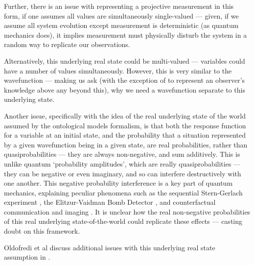 \documentclass[superscriptaddress, floatfix,nofootinbib,12pt]{revtex4-2}
\begin{document}
Further, there is an issue with representing a projective measurement in this form, if one assumes all values are simultaneously single-valued --- given, if we assume all system evolution except measurement is deterministic (as quantum mechanics does), it implies measurement must physically disturb the system in a random way to replicate our observations.

Alternatively, this underlying real state could be multi-valued --- variables could have a number of values simultaneously. However, this is very similar to the wavefunction --- making us ask (with the exception of to represent an observer's knowledge above any beyond this), why we need a wavefunction separate to this underlying state.

Another issue, specifically with the idea of the real underlying state of the world assumed by the ontological models formalism, is that both the response function for a variable at an initial state, and the probability that a situation represented by a given wavefunction being in a given state, are real probabilities, rather than quasiprobabilities --- they are always non-negative, and sum additively. This is unlike quantum `probability amplitudes', which are really quasiprobabilities --- they can be negative or even imaginary, and so can interfere destructively with one another. This negative probability interference is a key part of quantum mechanics, explaining peculiar phenomena such as the sequential Stern-Gerlach experiment \cite{Sakurai2017Modern}, the Elitzur-Vaidman Bomb Detector \cite{Elitzur1993BombDet}, and counterfactual communication \cite{Salih2013CFComms,Hance2019Quantum} and imaging \cite{Hance2020CFGI}. It is unclear how the real non-negative probabilities of this real underlying state-of-the-world could replicate these effects --- casting doubt on this framework.

Oldofredi et al discuss additional issues with this underlying real state assumption in \cite{Oldofredi2020Classification}.
\end{document}
